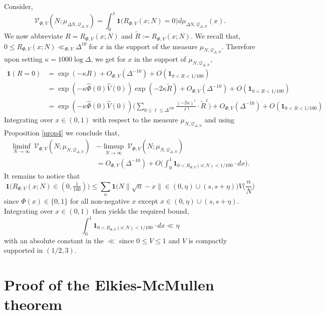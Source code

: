 \documentclass[12pt,reqno]{amsart}
\theoremstyle{plain}
\numberwithin{equation}{section}
\numberwithin{figure}{section}
\theoremstyle{plain}
\theoremstyle{definition}
\theoremstyle{remark}
\begin{document}
Consider, 
$$
\mathcal{V}_{\Phi,V} (N; \mu_{\Delta N, \mathcal{Q}_{\Delta, N}}) = \int_{0}^{1} \mathbf{1} \Big ( R_{\Phi, V}(x; N) = 0\Big )  d \mu_{\Delta N, \mathcal{Q}_{\Delta, N}}(x). 
$$
We now abbreviate $R = R_{\Phi, V}(x; N)$ and $\widetilde{R} := R_{\Phi, V}(x; N)$. 
We recall that, $0 \leq R_{\Phi, V}(x; N) \ll_{\Phi, V} \Delta^{10}$ for $x$ in the support of the measure $\mu_{N, \mathcal{Q}_{\Delta, N}}$. Therefore upon setting $\kappa = 1000 \log \Delta$, we get for $x$ in the support of $\mu_{N, \mathcal{Q}_{\Delta, N}}$,
\begin{align*}
\mathbf{1} ( R = 0 ) & = \exp( - \kappa R ) + O_{\Phi, V}(\Delta^{-10}) + O(\mathbf{1}_{0 < R < 1/100}) \\ & = \exp( - \kappa \widehat{\Phi}(0) \widehat{V}(0)) \exp( - 2 \kappa \widetilde{R}) + O_{\Phi, V} (\Delta^{-10}) + O(\mathbf{1}_{0 < R < 1/100}) \\ & = \exp( - \kappa \widehat{\Phi}(0) \widehat{V}(0)) \Big ( \sum_{0 \leq \ell \leq \Delta^{100}} \frac{(-2 \kappa)^{\ell}}{\ell!} \cdot \widetilde{R}^{\ell} \Big ) + O_{\Phi, V}(\Delta^{-10}) + O(\mathbf{1}_{0 < R < 1/100})
\end{align*}
Integrating over $x \in (0,1)$ with respect to the measure $\mu_{N, \mathcal{Q}_{\Delta, N}}$ and using Proposition \ref{prop4} we conclude that, 
\begin{align*}
\liminf_{N \rightarrow \infty} \ \mathcal{V}_{\Phi,V} (N; \mu_{N, \mathcal{Q}_{\Delta, N}}) & - \limsup_{N \rightarrow \infty} \ \mathcal{V}_{\Phi,V} (N; \mu_{N, \mathcal{Q}_{\Delta, N}}) \\ & = O_{\Phi, V}(\Delta^{-10}) + O \Big (\int_{0}^{1} \mathbf{1}_{0 < R_{\Phi, V}(x; N) < 1 / 100} \cdot dx \Big ).
\end{align*}
It remains to notice that 
$$\mathbf{1} \Big ( R_{\Phi, V}(x; N) \in (0, \tfrac{1}{100}) \Big ) \leq \sum_{n} \mathbf{1} \Big ( N \| \sqrt{n} - x \| \in (0,\eta) \cup (s, s + \eta) \Big ) V \Big ( \frac{n}{N} \Big )$$
since $\Phi(x) \in \{0,1\}$ for all non-negative $x$ except $x \in (0, \eta) \cup (s, s + \eta)$. 
Integrating over $x \in (0,1)$ then yields the required bound, 
$$
\int_{0}^{1} \mathbf{1}_{0 < R_{\Phi, V}(x; N) < 1/100} \cdot dx \ll \eta
$$
with an absolute constant in the $\ll$ since $0 \leq V \leq 1$ and $V$ is compactly supported in $(1/2, 3)$.

\section{Proof of the Elkies-McMullen theorem}\label{se:proofall}
\end{document}
